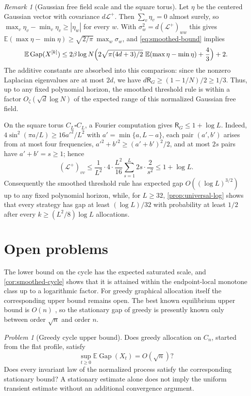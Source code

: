 \documentclass[11pt]{article}
\theoremstyle{remark}
\newtheorem{remark}[remark]{Remark}
\newtheorem{problem}[problem]{Problem}
\newcommand{\E}{\mathbb{E}}
\newcommand{\Gap}{\operatorname{Gap}}
\begin{document}
\begin{remark}[Gaussian free field scale and the square torus]\label{rem:smoothed-gff}
Let $\eta$ be the centered Gaussian vector with covariance $d\mathcal L^+$. Then $\sum_v\eta_v=0$ almost surely, so $\max_v\eta_v-\min_v\eta_v\ge|\eta_w|$ for every $w$. With $\sigma_w^2=d(\mathcal L^+)_{ww}$ this gives $\E(\max\eta-\min\eta)\ge\sqrt{2/\pi}\,\max_w\sigma_w$, and \eqref{eq:smoothed-bound} implies
\[
 \E\Gap(X^{[k]})\le 2\beta\log N\Bigl(2\sqrt{\pi(4d+3)/2}\ \E(\max\eta-\min\eta)+\frac43\Bigr)+2.
\]
The additive constants are absorbed into this comparison: since the nonzero Laplacian eigenvalues are at most $2d$, we have $d\mathsf R_G\ge(1-1/N)/2\ge1/3$. Thus, up to any fixed polynomial horizon, the smoothed threshold rule is within a factor $O_\zeta(\sqrt d\log N)$ of the expected range of this normalized Gaussian free field.

On the square torus $C_L\square C_L$, a Fourier computation gives $\mathsf R_G\le1+\log L$. Indeed, $4\sin^2(\pi a/L)\ge16a'^2/L^2$ with $a'=\min\{a,L-a\}$, each pair $(a',b')$ arises from at most four frequencies, $a'^2+b'^2\ge(a'+b')^2/2$, and at most $2s$ pairs have $a'+b'=s\ge1$; hence
\[
 (\mathcal L^+)_{vv}\le\frac1{L^2}\cdot4\cdot\frac{L^2}{16}\sum_{s=1}^{L}2s\cdot\frac2{s^2}\le1+\log L.
\]
Consequently the smoothed threshold rule has expected gap $O((\log L)^{3/2})$ up to any fixed polynomial horizon, while, for $L\ge32$, \cref{prop:universal-log} shows that every strategy has gap at least $(\log L)/32$ with probability at least $1/2$ after every $k\ge(L^2/8)\log L$ allocations.
\end{remark}

\section{Open problems}\label{sec:open}

The lower bound on the cycle has the expected saturated scale, and \cref{cor:smoothed-cycle} shows that it is attained within the endpoint-local monotone class up to a logarithmic factor. For greedy graphical allocation itself the corresponding upper bound remains open. The best known equilibrium upper bound is $O(n)$ \cite{OleskerTaylorSauerwaldZanetti2026}, so the stationary gap of greedy is presently known only between order $\sqrt n$ and order $n$.

\begin{problem}[Greedy cycle upper bound]
Does greedy allocation on $C_n$, started from the flat profile, satisfy
\[
 \sup_{t\ge0}\E\Gap(X_t)=O(\sqrt n)?
\]
Does every invariant law of the normalized process satisfy the corresponding stationary bound? A stationary estimate alone does not imply the uniform transient estimate without an additional convergence argument.
\end{problem}
\end{document}
